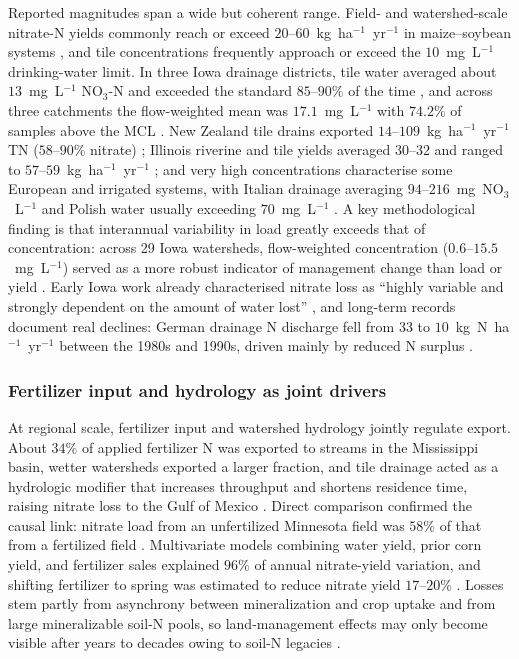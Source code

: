 Reported magnitudes span a wide but coherent range. Field- and
watershed-scale nitrate-N yields commonly reach or exceed
$20$--$60$~kg~ha$^{-1}$~yr$^{-1}$ in maize--soybean systems
\parencite{Gentry2009,Gentry2014,Dattamudi2020,Tomer2008}, and tile
concentrations frequently approach or exceed the $10$~mg~L$^{-1}$
drinking-water limit. In three Iowa drainage districts, tile water averaged
about $13$~mg~L$^{-1}$ NO$_3$-N and exceeded the standard $85$--$90\%$ of
the time \parencite{Schilling2012b}, and across three catchments the
flow-weighted mean was $17.1$~mg~L$^{-1}$ with $74.2\%$ of samples above the
MCL \parencite{Ikenberry2014}. New Zealand tile drains exported
$14$--$109$~kg~ha$^{-1}$~yr$^{-1}$ TN ($58$--$90\%$ nitrate)
\parencite{Tanner2011}; Illinois riverine and tile yields averaged
$30$--$32$ and ranged to $57$--$59$~kg~ha$^{-1}$~yr$^{-1}$
\parencite{Gentry2014}; and very high concentrations characterise some
European and irrigated systems, with Italian drainage averaging
$94$--$216$~mg~NO$_3$~L$^{-1}$ \parencite{ROSSI1991} and Polish water
usually exceeding $70$~mg~L$^{-1}$ \parencite{Dragon2016}. A key
methodological finding is that interannual variability in load greatly
exceeds that of concentration: across 29 Iowa watersheds, flow-weighted
concentration ($0.6$--$15.5$~mg~L$^{-1}$) served as a more robust indicator
of management change than load or yield \parencite{Danalatos2022}. Early
Iowa work already characterised nitrate loss as ``highly variable and
strongly dependent on the amount of water lost'' \parencite{BAKER1975}, and
long-term records document real declines: German drainage N discharge fell
from $33$ to $10$~kg~N~ha$^{-1}$~yr$^{-1}$ between the 1980s and 1990s,
driven mainly by reduced N surplus \parencite{Hirt2005b}.

\subsubsection{Fertilizer input and hydrology as joint drivers}

At regional scale, fertilizer input and watershed hydrology jointly
regulate export. About $34\%$ of applied fertilizer N was exported to
streams in the Mississippi basin, wetter watersheds exported a larger
fraction, and tile drainage acted as a hydrologic modifier that increases
throughput and shortens residence time, raising nitrate loss to the Gulf of
Mexico \parencite{Raymond2012}. Direct comparison confirmed the causal
link: nitrate load from an unfertilized Minnesota field was $58\%$ of that
from a fertilized field \parencite{Ghane2016b}. Multivariate models
combining water yield, prior corn yield, and fertilizer sales explained
$96\%$ of annual nitrate-yield variation, and shifting fertilizer to spring
was estimated to reduce nitrate yield $17$--$20\%$ \parencite{Gentry2014}.
Losses stem partly from asynchrony between mineralization and crop uptake
and from large mineralizable soil-N pools, so land-management effects may
only become visible after years to decades owing to soil-N legacies
\parencite{Cambardella1999,Bauwe2020}.

